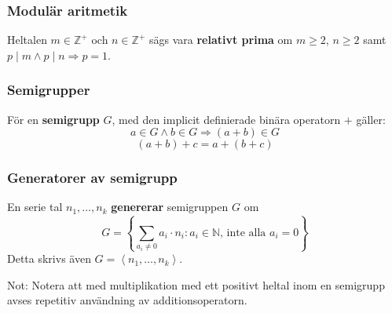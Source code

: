 \documentclass{beamer}
\begin{document}
\begin{frame}
	\frametitle{Modulär aritmetik}
\begin{Definition}
	Heltalen $m \in \mathbb{Z}^+$ och $n \in \mathbb{Z}^+$ sägs vara \textbf{relativt prima} om $m \geq 2$, $n \geq 2$ samt $p \mid m \wedge p \mid n \Longrightarrow p = 1$.
\end{Definition}
\end{frame}

\begin{frame}
	\frametitle{Semigrupper}
\begin{Definition}
	För en \textbf{semigrupp} $G$, med den implicit definierade binära operatorn $+$ gäller:
	\[a \in G \wedge b \in G \Longrightarrow (a + b) \in G\]
	\[(a+b)+c = a+(b+c)\]
\end{Definition}
\end{frame}

\begin{frame}
	\frametitle{Generatorer av semigrupp}
\begin{Definition}
	En serie tal $n_1, \ldots, n_k$ \textbf{genererar} semigruppen $G$ om
	\[G = \left\{\sum_{a_i\neq 0} a_i \cdot n_i : a_i \in \mathbb{N}\text{, inte alla $a_i=0$}\right\}\]
	Detta skrivs även $G = \left<n_1, \ldots, n_k \right>$.
\end{Definition}

\vspace{20pt}
\scriptsize Not: Notera att med multiplikation med ett positivt heltal inom en semigrupp avses repetitiv användning av additionsoperatorn.
\end{frame}
\end{document}
